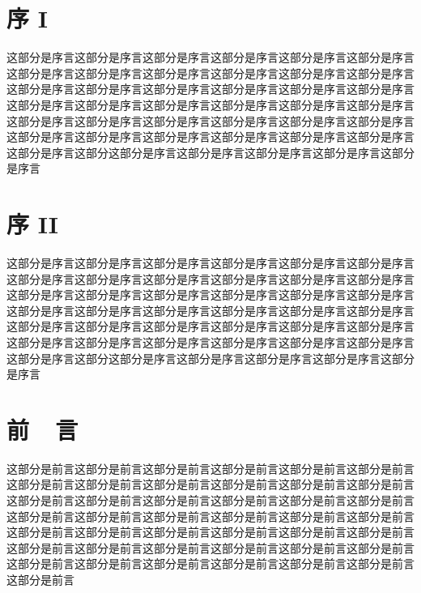 \documentclass[UTF8,openany,twoside,12pt]{book}
\theoremstyle{plain}
\begin{document}
\thispagestyle{empty}



\frontmatter   %




\chapter{序 I}

这部分是序言这部分是序言这部分是序言这部分是序言这部分是序言这部分是序言这部分是序言这部分是序言这部分是序言这部分是序言这部分是序言这部分是序言这部分是序言这部分是序言这部分是序言这部分是序言这部分是序言这部分是序言这部分是序言这部分是序言这部分是序言这部分是序言这部分是序言这部分是序言这部分是序言这部分是序言这部分是序言这部分是序言这部分是序言这部分是序言这部分是序言这部分是序言这部分是序言这部分是序言这部分是序言这部分是序言这部分是序言这部分这部分是序言这部分是序言这部分是序言这部分是序言这部分是序言


\chapter{序 II}

这部分是序言这部分是序言这部分是序言这部分是序言这部分是序言这部分是序言这部分是序言这部分是序言这部分是序言这部分是序言这部分是序言这部分是序言这部分是序言这部分是序言这部分是序言这部分是序言这部分是序言这部分是序言这部分是序言这部分是序言这部分是序言这部分是序言这部分是序言这部分是序言这部分是序言这部分是序言这部分是序言这部分是序言这部分是序言这部分是序言这部分是序言这部分是序言这部分是序言这部分是序言这部分是序言这部分是序言这部分是序言这部分这部分是序言这部分是序言这部分是序言这部分是序言这部分是序言

\chapter{前~~言}

这部分是前言这部分是前言这部分是前言这部分是前言这部分是前言这部分是前言这部分是前言这部分是前言这部分是前言这部分是前言这部分是前言这部分是前言这部分是前言这部分是前言这部分是前言这部分是前言这部分是前言这部分是前言这部分是前言这部分是前言这部分是前言这部分是前言这部分是前言这部分是前言这部分是前言这部分是前言这部分是前言这部分是前言这部分是前言这部分是前言这部分是前言这部分是前言这部分是前言这部分是前言这部分是前言这部分是前言这部分是前言这部分是前言这部分是前言这部分是前言这部分是前言这部分是前言这部分是前言
\end{document}
